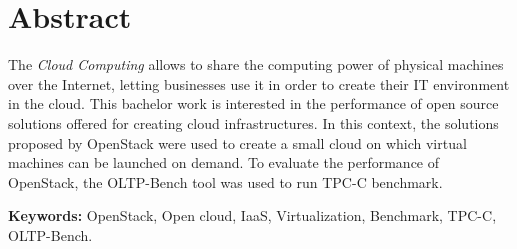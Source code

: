 \documentclass[a4paper, 12pt, oneside, titlepage]{scrbook}
\begin{document}

\tableofcontents
\listoffigures
\listoftables
\doublespacing



\chapter*{Abstract}
\thispagestyle{empty}
The \textit{Cloud Computing} allows to share the computing power of physical machines over the Internet, letting businesses use it in order to create their IT environment in the cloud.
This bachelor work is interested in the performance of open source solutions offered for creating cloud infrastructures.
In this context, the solutions proposed by OpenStack were used to create a small cloud on which virtual machines can be launched on demand.
To evaluate the performance of OpenStack, the OLTP-Bench tool was used to run TPC-C benchmark.

{\bf Keywords:} OpenStack, Open cloud, IaaS, Virtualization, Benchmark, TPC-C, OLTP-Bench.






























% 
% 

















\end{document}
